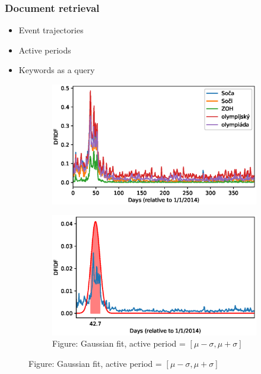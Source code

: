 \documentclass{beamer}
\begin{document}
\begin{frame}
\frametitle{Document retrieval}
\begin{minipage}[c]{0.50\textwidth}
\begin{itemize}
\item Event trajectories
\item Active periods
\item Keywords as a query
\end{itemize}
\end{minipage}
\hfill
\begin{minipage}[c]{0.45\textwidth}
\begin{figure}
\centering
   \begin{subfigure}{\textwidth}
   \includegraphics[width=1\linewidth]{39_words}
\end{subfigure}

\begin{subfigure}{\textwidth}
   \includegraphics[width=1\linewidth]{39_density_fit}
   \caption*{{\color{prettyblue}Figure:} Gaussian fit, active period = $[\mu - \sigma, \mu + \sigma]$}
\end{subfigure}
\end{figure}
\end{minipage}
\end{frame}
\end{document}
